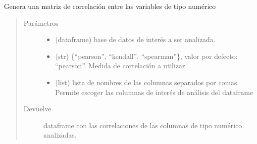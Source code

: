 \documentclass[letterpaper,10pt,openany,spanish]{sphinxmanual}
\begin{document}
\begin{fulllineitems}
\label{\detokenize{datos:datos.correlacion}}
Genera una matriz de correlación entre las variables de tipo numérico
\begin{quote}\begin{description}
\item[{Parámetros}] \leavevmode\begin{itemize}
\item {} 
 \textendash{} (dataframe) base de datos de interés a ser analizada.

\item {} 
 \textendash{} (str) \{“pearson”, “kendall”, “spearman”\}, valor por defecto: “pearson”. Medida de correlación a utilizar.

\item {} 
 \textendash{} (list) lista de nombres de las columnas separados por comas. Permite escoger las columnas de interés de análisis del dataframe

\end{itemize}

\item[{Devuelve}] \leavevmode
dataframe con las correlaciones de las columnas de tipo numérico analizadas.

\end{description}\end{quote}

\end{fulllineitems}

\end{document}
